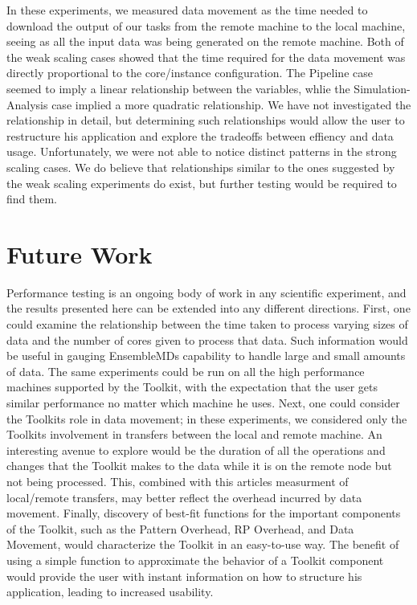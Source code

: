 \documentclass[]{article}
\begin{document}
    In these experiments, we measured data movement as the time needed to download the output of our tasks from the remote machine to the local machine, seeing as all the input data was being generated on the remote machine. Both of the weak scaling cases showed that the time required for the data movement was directly proportional to the core/instance configuration. The Pipeline case seemed to imply a linear relationship between the variables, whlie the Simulation-Analysis case implied a more quadratic relationship. We have not investigated the relationship in detail, but determining such relationships would allow the user to restructure his application and explore the tradeoffs between effiency and data usage. Unfortunately, we were not able to notice distinct patterns in the strong scaling cases. We do believe that relationships similar to the ones suggested by the weak scaling experiments do exist, but further testing would be required to find them.

\section{Future Work}
	Performance testing is an ongoing body of work in any scientific experiment, and the results presented here can be extended into any different directions. First, one could examine the relationship between the time taken to process varying sizes of data and the number of cores given to process that data. Such information would be useful in gauging EnsembleMD\textquotesingle s capability to handle large and small amounts of data. The same experiments could be run on all the high performance machines supported by the Toolkit, with the expectation that the user gets similar performance no matter which machine he uses. Next, one could consider the Toolkit\textquotesingle s role in data movement; in these experiments, we considered only the Toolkit\textquotesingle s involvement in transfers between the local and remote machine. An interesting avenue to explore would be the duration of all the operations and changes that the Toolkit makes to the data while it is on the remote node but not being processed. This, combined with this article\textquotesingle s measurment of local/remote transfers, may better reflect the overhead incurred by data movement. Finally, discovery of best-fit functions for the important components of the Toolkit, such as the Pattern Overhead, RP Overhead, and Data Movement, would characterize the Toolkit in an easy-to-use way. The benefit of using a simple function to approximate the behavior of a Toolkit component would provide the user with instant information on how to structure his application, leading to increased usability.
\end{document}
